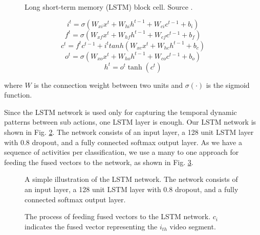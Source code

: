 \begin{figure}
  \centering
  
  \caption{Long short-term memory (LSTM) block cell. Source \cite{Graves2008supervised}.}\label{fi:lstmblock}
\end{figure}

\begin{equation}
i^{t} = \sigma (W_{xi}x^t + W_{hi}h^{t-1} + W_{ci}c^{t-1} + b_{i})
\end{equation}
\begin{equation}
f^{t} = \sigma (W_{xf}x^t + W_{hf}h^{t-1} + W_{cf}c^{t-1} + b_{f})
\end{equation}
\begin{equation}
c^{t} = f^tc^{t-1} + i^ttanh(W_{xc}x^t + W_{hc}h^{t-1} + b_{c})
\end{equation}
\begin{equation}
o^{t} = \sigma (W_{xo}x^t + W_{ho}h^{t-1} + W_{co}c^{t-1} + b_{o})
\end{equation}
\begin{equation}
h^t = o^t\tanh(c^t)
\end{equation}

where $W$ is the connection weight between two units and $\sigma(\cdot)$ is the sigmoid function.

Since the LSTM network is used only for capturing the temporal dynamic patterns between sub actions, one LSTM layer is enough.
Our LSTM network is shown in Fig. \ref{fi:layers}. The network consists of an input layer, a 128 unit LSTM layer with 0.8 dropout, and
a fully connected softmax output layer. As we have a sequence of activities per classification, we use a many to one approach
for feeding the fused vectors to the network, as shown in Fig. \ref{fi:lstm}.

\begin{figure}
  \centering
  
  \caption{A simple illustration of the LSTM network. The network consists of an input layer, a 128 unit LSTM layer with 0.8 dropout, and
a fully connected softmax output layer.}\label{fi:layers}
\end{figure}

\begin{figure}
  \centering
  
  \caption{The process of feeding fused vectors to the LSTM network. $c_{i}$ indicates the fused vector representing the $i_{th}$
  video segment.}\label{fi:lstm}
\end{figure}



